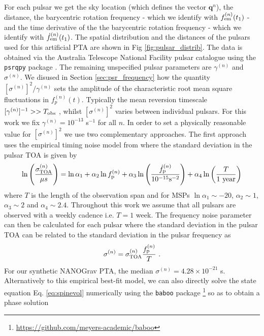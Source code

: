 \documentclass[fleqn,usenatbib,useAMS]{mnras}
\begin{document}
For each pulsar we get the sky location (which defines the vector $\boldsymbol{q}^{n}$), the distance, the barycentric rotation frequency - which we identify with $f_{\rm em}^{(n)} (t_1)$ -  and the time derivative of the the barycentric rotation frequency - which we identify with $\dot{f}_{\rm em}^{(n)} (t_1)$. The spatial distribution and the distances of the pulsars used for this artificial PTA are shown in Fig \ref{fig:pulsar_distrib}. The data is obtained via the Australia Telescope National Facility pulsar catalogue \citep{Manchester2005} using the \texttt{psrqpy} package \citep{psrqpy}. The remaining unspecified pulsar parameters are $\gamma^{(n)}$ and $\sigma^{(n)}$. We disused in Section \ref{sec:psr_frequency} how the quantity $[\sigma^{(n)}]^2 /\gamma^{(n)} $ sets the amplitude of the characteristic root mean square fluctuations in $f_p^{(n)}(t)$. Typically the mean reversion timescale $[\gamma^{(n)}]^{-1} >> T_{\rm obs}$ \cite{Vargas}, whilst $[\sigma^{(n)}]^2$ varies between individual pulsars. For this work we fix $\gamma^{(n)} = 10^{-13}$ s$^{-1}$ for all $n$. In order to set a physically reasonable value for $[\sigma^{(n)}]^2$ we use two complementary approaches. The first approach uses the empirical timing noise model from \cite{Shannon2010ApJ...725.1607S} where the standard deviation in the pulsar TOA is given by
\begin{eqnarray}
	\ln \left(\frac{\sigma_{\rm TOA}^{(n)}}{\mu s} \right)= \ln \alpha_1 +  \alpha_2 \ln f_{\rm p}^{(n)} + \alpha_3 \ln \left(\frac{\dot{f}_{\rm p}^{(n)}}{10^{-15} \text{s}^{-2}} \right)+ \alpha_4 \ln \left( \frac{T}{ 1 \text{ year}} \right) \label{eq:sigmap}
\end{eqnarray}
where $T$ is the length of the observation span and for MSPs $\ln \alpha_1 \sim -20 $, $\alpha_2 \sim 1$, $\alpha_3 \sim 2$ and $\alpha_4 \sim 2.4$. Throughout this work we assume that all pulsars are observed with a weekly cadence i.e. $T = 1$ week. The frequency noise parameter can then be calculated for each pulsar where the standard deviation in the pulsar TOA can be related to the standard deviation in the pulsar frequency as 
\begin{eqnarray}
	\sigma^{(n)} = \sigma_{\rm TOA}^{(n)} \frac{f_{\rm p}^{(n)}}{T} \ . \label{eq:sigmap_f}
\end{eqnarray}
For our synthetic NANOGrav PTA, the median $\sigma^{(n)} = 4.28 \times 10^{-21} $ s. Alternatively to this empirical best-fit model, we can also directly solve the state equation Eq. \ref{eq:spinevol} numerically using the \texttt{baboo} package \footnote{\url{https://github.com/meyers-academic/baboo}} so as to obtain a phase solution
\end{document}
